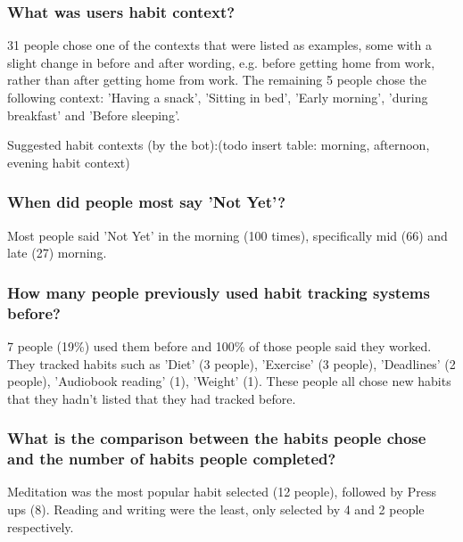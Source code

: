 \subsubsection*{What was users habit context?}
31 people chose one of the contexts that were listed as examples, some with a slight change in before and after wording, e.g. before getting home from work, rather than after getting home from work. The remaining 5 people chose the following context: 'Having a snack', 'Sitting in bed', 'Early morning', 'during breakfast' and 'Before sleeping'.

Suggested habit contexts (by the bot):(todo insert table: morning, afternoon, evening habit context)





\subsubsection*{When did people most say 'Not Yet'?}
Most people said 'Not Yet' in the morning (100 times), specifically mid (66) and late (27) morning.



\subsubsection*{How many people previously used habit tracking systems before?}
7 people (19\%) used them before and 100\% of those people said they worked. They tracked habits such as 'Diet' (3 people), 'Exercise' (3 people), 'Deadlines' (2 people), 'Audiobook reading' (1), 'Weight' (1). These people all chose new habits that they hadn't listed that they had tracked before.

\subsubsection*{What is the comparison between the habits people chose and the number of habits people completed?}
Meditation was the most popular habit selected (12 people), followed by Press ups (8). Reading and writing were the least, only selected by 4 and 2 people respectively.

